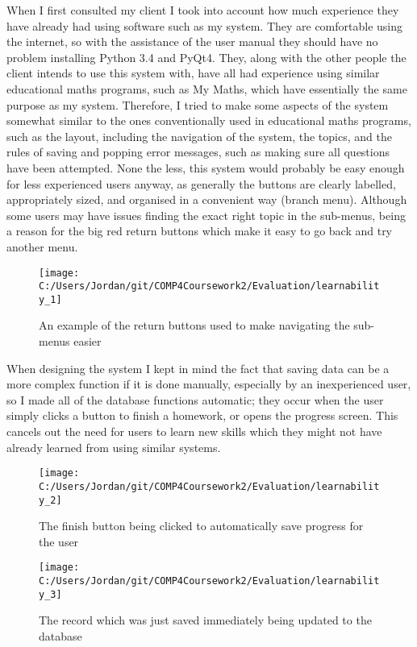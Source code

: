 When I first consulted my client I took into account how much experience they have already had using software such as my system. They are comfortable using the internet, so with the assistance of the user manual they should have no problem installing Python 3.4 and PyQt4. They, along with the other people the client intends to use this system with, have all had experience using similar educational maths programs, such as My Maths, which have essentially the same purpose as my system. Therefore, I tried to make some aspects of the system somewhat similar to the ones conventionally used in educational maths programs, such as the layout, including the navigation of the system, the topics, and the rules of saving and popping error messages, such as making sure all questions have been attempted. None the less, this system would probably be easy enough for less experienced users anyway, as generally the buttons are clearly labelled, appropriately sized, and organised in a convenient way (branch menu). Although some users may have issues finding the exact right topic in the sub-menus, being a reason for the big red return buttons which make it easy to go back and try another menu.

\begin{figure}[H]
	\texttt{[image: C:/Users/Jordan/git/COMP4Coursework2/Evaluation/learnability\_1]}
	\caption{An example of the return buttons used to make navigating the sub-menus easier}
\end{figure}

When designing the system I kept in mind the fact that saving data can be a more complex function if it is done manually, especially by an inexperienced user, so I made all of the database functions automatic; they occur when the user simply clicks a button to finish a homework, or opens the progress screen. This cancels out the need for users to learn new skills which they might not have already learned from using similar systems.

\begin{figure}[H]
	\texttt{[image: C:/Users/Jordan/git/COMP4Coursework2/Evaluation/learnability\_2]}
	\caption{The finish button being clicked to automatically save progress for the user}
\end{figure}

\begin{figure}[H]
	\texttt{[image: C:/Users/Jordan/git/COMP4Coursework2/Evaluation/learnability\_3]}
	\caption{The record which was just saved immediately being updated to the database}
\end{figure}

